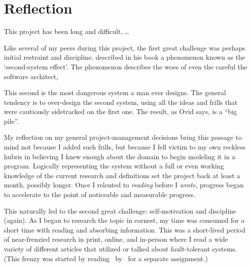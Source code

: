 \section{Reflection}
\label{sec:reflection}

This project has been long and difficult, \dots

Like several of my peers during this project,
  the first great challenge was perhaps initial restraint and discipline.
\citeauthor{brooks:mythical-man-month} described in his book 
  a phenomenon known as the \enquote*{second-system effect}.
The phenomenon describes the woes of even the careful the software architect,
\begin{displayquote}
  This second is the most dangerous system a man ever designs.
  \Elide
  The general tendency is to over-design the second system,
    using all the ideas and frills that were cautiously sidetracked on the first one.
  The result, as Ovid says, is a \enquote{big pile}.
\end{displayquote}
My reflection on my general project-management decisions bring this passage to mind
  not because I added such frills, but because I fell victim to my own reckless hubris
  in believing I knew enough about the domain to begin modeling it in a program.
Logically representing the system without a full \Dash or even working \Dash
  knowledge of the current research and definitions set the project back at least a month, possibly longer.
Once I relented to \emph{reading} before I \emph{wrote},
  progress began to accelerate to the point of noticeable and measurable progress.

This naturally led to the second great challenge: self-motivation and discipline (again).
As I began to research the topic in earnest,
  my time was consumed for a short time with reading and absorbing information.
This was a short-lived period of near-frenzied research
  \Dash in print, online, and in-person \Dash
  where I read a wide variety of different articles that utilized or talked about fault-tolerant systems.
(This frenzy was started by reading~ by~\citeauthor{goddard:ssa--k-distance} for a separate assignment.)

